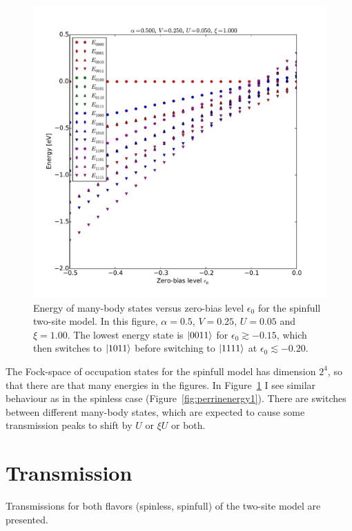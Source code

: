 \begin{figure}[htb]
    \centering
    \includegraphics[height=.45\textheight]{pdf/energy/pespin_distribution_u1_k2.pdf}
    \caption{Energy of many-body states versus zero-bias level $\epsilon_0$ for the spinfull two-site model. In this figure, $\alpha=0.5$, $V=0.25$, $U=0.05$ and $\xi=1.00$. The lowest energy state is $\ket{0011}$ for $\epsilon_0\gtrsim -0.15$, which then switches to $\ket{1011}$ before switching to $\ket{1111}$ at $\epsilon_0 \lesssim -0.20$. }
    \label{fig:perspinenergy12}
\end{figure}  


The Fock-space of occupation states for the spinfull model has dimension $2^4$, so that there are that many energies in the figures. In Figure~\ref{fig:perspinenergy12} I see similar behaviour as in the spinless case (Figure~\ref{fig:perrinenergy1}). There are switches between different many-body states, which are expected to cause some transmission peaks to shift by $U$ or $\xi U$ or both. 

\clearpage\section{Transmission}
\label{sec:twositetransmission}
Transmissions for both flavors (spinless, spinfull) of the two-site model are presented. 
